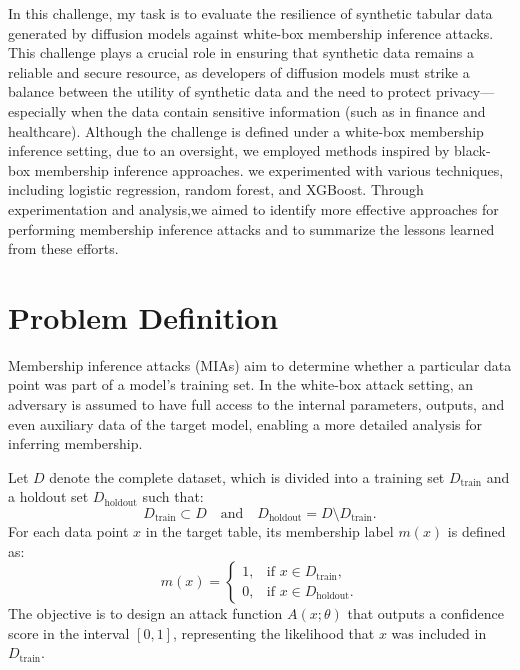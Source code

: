 \documentclass[12pt]{article}
\begin{document}
In this challenge, my task is to evaluate the resilience of synthetic tabular data generated by diffusion models against white-box membership inference attacks. This challenge plays a crucial role in ensuring that synthetic data remains a reliable and secure resource, as developers of diffusion models must strike a balance between the utility of synthetic data and the need to protect privacy—especially when the data contain sensitive information (such as in finance and healthcare). Although the challenge is defined under a white-box membership inference setting, due to an oversight, we employed methods inspired by black-box membership inference approaches. we experimented with various techniques, including logistic regression, random forest, and XGBoost. Through experimentation and analysis,we aimed to identify more effective approaches for performing membership inference attacks and to summarize the lessons learned from these efforts.

\section{Problem Definition}
Membership inference attacks (MIAs) aim to determine whether a particular data point was part of a model's training set. In the white-box attack setting, an adversary is assumed to have full access to the internal parameters, outputs, and even auxiliary data of the target model, enabling a more detailed analysis for inferring membership.

Let \(D\) denote the complete dataset, which is divided into a training set \(D_{\text{train}}\) and a holdout set \(D_{\text{holdout}}\) such that:
\[
D_{\text{train}} \subset D \quad \text{and} \quad D_{\text{holdout}} = D \setminus D_{\text{train}}.
\]
For each data point \(x\) in the target table, its membership label \(m(x)\) is defined as:
\[
m(x) = 
\begin{cases}
1, & \text{if } x \in D_{\text{train}}, \\
0, & \text{if } x \in D_{\text{holdout}}.
\end{cases}
\]
The objective is to design an attack function \(A(x; \theta)\) that outputs a confidence score in the interval \([0,1]\), representing the likelihood that \(x\) was included in \(D_{\text{train}}\).
\end{document}
